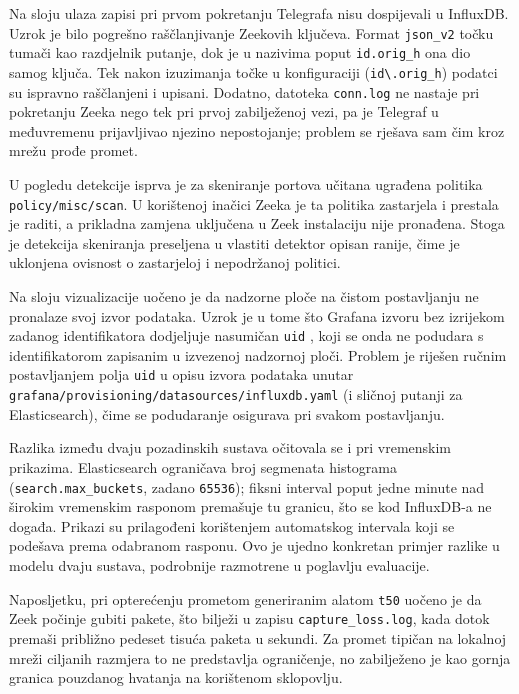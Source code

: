 Na sloju ulaza zapisi pri prvom pokretanju Telegrafa nisu dospijevali u InfluxDB. Uzrok je bilo pogrešno raščlanjivanje Zeekovih ključeva. Format \texttt{json\_v2} točku tumači
kao razdjelnik putanje, dok je u nazivima poput \texttt{id.orig\_h} ona dio samog ključa. Tek nakon izuzimanja točke u konfiguraciji (\texttt{id\textbackslash.orig\_h}) podatci su
ispravno raščlanjeni i upisani. Dodatno, datoteka \texttt{conn.log} ne nastaje pri pokretanju Zeeka nego tek pri prvoj zabilježenoj vezi, pa je Telegraf u međuvremenu prijavljivao
njezino nepostojanje; problem se rješava sam čim kroz mrežu prođe promet.

U pogledu detekcije isprva je za skeniranje portova učitana ugrađena politika \texttt{policy/misc/scan}. U korištenoj inačici Zeeka je ta politika zastarjela i prestala je
raditi, a prikladna zamjena uključena u Zeek instalaciju nije pronađena. Stoga je detekcija skeniranja preseljena u vlastiti detektor opisan ranije, čime je uklonjena ovisnost o
zastarjeloj i nepodržanoj politici.

Na sloju vizualizacije uočeno je da nadzorne ploče na čistom postavljanju ne pronalaze svoj izvor podataka. Uzrok je u tome što Grafana izvoru bez izrijekom zadanog identifikatora
dodjeljuje nasumičan \texttt{uid} \cite{grafana_docs}, koji se onda ne podudara s identifikatorom zapisanim u izvezenoj nadzornoj ploči. Problem je riješen ručnim postavljanjem polja
\texttt{uid} u opisu izvora podataka unutar \texttt{grafana/provisioning/datasources/influxdb.yaml} (i sličnoj putanji za Elasticsearch), čime se podudaranje 
osigurava pri svakom postavljanju.

Razlika između dvaju pozadinskih sustava očitovala se i pri vremenskim prikazima. Elasticsearch ograničava broj segmenata histograma (\texttt{search.max\_buckets}, zadano
\texttt{65536}); fiksni interval poput jedne minute nad širokim vremenskim rasponom premašuje tu granicu, što se kod InfluxDB-a ne događa. Prikazi su prilagođeni korištenjem
automatskog intervala koji se podešava prema odabranom rasponu. Ovo je ujedno konkretan primjer razlike u modelu dvaju sustava, podrobnije razmotrene u poglavlju evaluacije.

Naposljetku, pri opterećenju prometom generiranim alatom \texttt{t50} uočeno je da Zeek počinje gubiti pakete, što bilježi u zapisu \texttt{capture\_loss.log}, kada dotok premaši
približno pedeset tisuća paketa u sekundi. Za promet tipičan na lokalnoj mreži ciljanih razmjera to ne predstavlja ograničenje, no zabilježeno je kao gornja granica pouzdanog
hvatanja na korištenom sklopovlju.